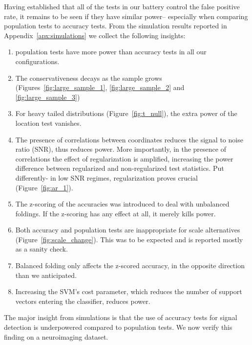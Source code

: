 \documentclass[12pt,a4paper]{article}
\theoremstyle{definition}
\begin{document}
Having established that all of the tests in our battery control the false positive rate, it remains to be seen if they have similar power-- 
especially when comparing population tests to accuracy tests. 
From the simulation results reported in Appendix~\ref{apx:simulations} we collect the following insights:
\begin{enumerate}
\item population tests have more power than accuracy tests in all our configurations.

\item The conservativeness decays as the sample grows (Figures~\ref{fig:large_sample_1}, \ref{fig:large_sample_2} and \ref{fig:large_sample_3})

\item For heavy tailed distributions (Figure~\ref{fig:t_null}), the extra power of the location test vanishes. 

\item The presence of correlations between coordinates reduces the signal to noise ratio (SNR), thus reduces power. 
More importantly, in the presence of correlations the effect of regularization is amplified, increasing the power difference between regularized and non-regularized test statistics.
Put differently- in low SNR regimes, regularization proves crucial (Figure~\ref{fig:ar_1}).

\item The z-scoring of the accuracies was introduced to deal with unbalanced foldings. 
If the z-scoring has any effect at all, it merely kills power.

\item Both accuracy and population tests are inappropriate for scale alternatives (Figure~\ref{fig:scale_change}). 
This was to be expected and is reported mostly as a sanity check.

\item Balanced folding only affects the z-scored accuracy, in the opposite direction than we anticipated. 

\item Increasing the SVM's cost parameter, which reduces the number of support vectors entering the classifier, reduces power. 

\end{enumerate}


The major insight from simulations is that the use of accuracy tests for signal detection is underpowered compared to population tests. 
We now verify this finding on a neuroimaging dataset.
\end{document}
